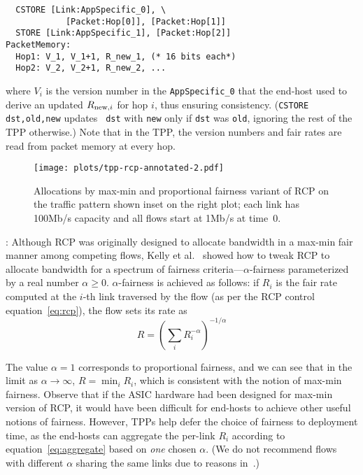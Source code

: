 \begin{verbatim}
  CSTORE [Link:AppSpecific_0], \
            [Packet:Hop[0]], [Packet:Hop[1]]
  STORE [Link:AppSpecific_1], [Packet:Hop[2]]
PacketMemory:
  Hop1: V_1, V_1+1, R_new_1, (* 16 bits each*)
  Hop2: V_2, V_2+1, R_new_2, ...
\end{verbatim}

\noindent where $V_i$ is the version number in the {\tt AppSpecific\_0} that
the end-host used to derive an updated $R_{{\rm new},i}$ for hop $i$,
thus ensuring consistency.  ({\tt CSTORE dst,old,new} updates {\tt
dst} with {\tt new} only if {\tt dst} was {\tt old}, ignoring the rest
of the TPP otherwise.)  Note that in the TPP, the version numbers
and fair rates are read from packet memory at every hop.




\begin{figure}[t]
\centering
\texttt{[image: plots/tpp-rcp-annotated-2.pdf]}
\caption{Allocations by max-min and proportional fairness variant of RCP
on the traffic pattern shown inset on the right plot; each link has
100Mb/s capacity and all flows start at 1Mb/s at time~0.}
\label{fig:rcp-new}\vspace{-1.2em}
\end{figure}

: Although RCP was originally designed to
allocate bandwidth in a max-min fair manner among competing flows,
Kelly et al.~\cite{kelly2008stability} showed how to tweak RCP to
allocate bandwidth for a spectrum of fairness
criteria---$\alpha$-fairness parameterized by a real number
$\alpha \geq 0$.  $\alpha$-fairness is achieved as follows: if $R_{i}$
is the fair rate computed at the $i$-th link traversed by the flow (as
per the RCP control equation~\ref{eq:rcp}), the flow sets its rate as
\begin{equation}\label{eq:aggregate}
R = \left(\sum\limits_i R_i^{-\alpha}\right)^{-1/\alpha}
\end{equation}

The value $\alpha=1$ corresponds to proportional fairness, and we can
see that in the limit as $\alpha\rightarrow\infty$, $R = \min_i R_i$,
which is consistent with the notion of max-min fairness.  Observe that
if the ASIC hardware had been designed for max-min version of RCP, it
would have been difficult for end-hosts to achieve other useful
notions of fairness.  However, TPPs help defer the choice of fairness
to deployment time, as the end-hosts can aggregate the per-link $R_i$
according to equation~\ref{eq:aggregate} based on \emph{one} chosen
$\alpha$. (We do not recommend flows with different $\alpha$
sharing the same links due to reasons in~\cite{tang2007equilibrium}.)


